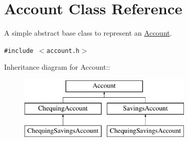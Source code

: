 \hypertarget{classAccount}{
\section{Account Class Reference}
\label{classAccount}
}
A simple abstract base class to represent an \hyperlink{classAccount}{Account}.  


{\tt \#include $<$account.h$>$}

Inheritance diagram for Account::\begin{figure}[H]
\begin{center}
\leavevmode
\includegraphics[height=3cm]{classAccount}
\end{center}
\end{figure}
